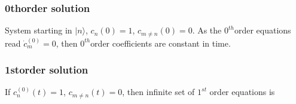 \documentclass[letterpaper,10pt,english]{jupyterBook}
\begin{document}
\subsubsection{0th\sphinxhyphen{}order solution}
\label{\detokenize{ch/quantum-mechanics/qft/interactions-perturbation:th-order-solution}}
\sphinxAtStartPar
System starting in \(| n \rangle\), \(c_n(0)=1\), \(c_{m \neq n}(0)=0\). As the \(0^{th}\)\sphinxhyphen{}order equations read \(\dot{c}^{(0)}_m = 0\), then \(0^{th}\)\sphinxhyphen{}order coefficients are constant in time.


\subsubsection{1st\sphinxhyphen{}order solution}
\label{\detokenize{ch/quantum-mechanics/qft/interactions-perturbation:st-order-solution}}
\sphinxAtStartPar
If \(c_n^{(0)}(t) = 1\), \(c_{m \neq n}(t) = 0\), then infinite set of \(1^{st}\) order equations is
\end{document}
